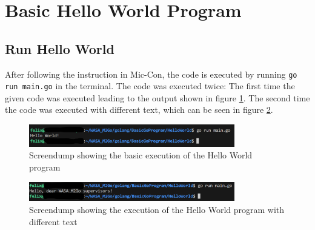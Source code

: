 
\section{Basic Hello World Program}
\label{sec:basic_hello_world_program}

\subsection{Run Hello World}
After following the instruction in Mic-Con, the code is executed by running \texttt{go run main.go} in the terminal.
The code was executed twice: The first time the given code was executed leading to the output shown in figure \ref{fig:screendump_helloWorld_basicExecution}.
The second time the code was executed with different text, which can be seen in figure \ref{fig:screendump_helloWorld_differentText}.

\begin{figure} [h]
    \centering
    \includegraphics[width=0.8\textwidth]{figures/goLang/helloWorld/golang_helloWorld_basicExecution.png}
    \caption{Screendump showing the basic execution of the Hello World program}
    \label{fig:screendump_helloWorld_basicExecution}
\end{figure}

\begin{figure}[h]
    \centering
    \includegraphics[width=0.8\textwidth]{figures/goLang/helloWorld/golang_helloWorld_ExecutionDifferentText.png}
    \caption{Screendump showing the execution of the Hello World program with different text}
    \label{fig:screendump_helloWorld_differentText}
\end{figure}

